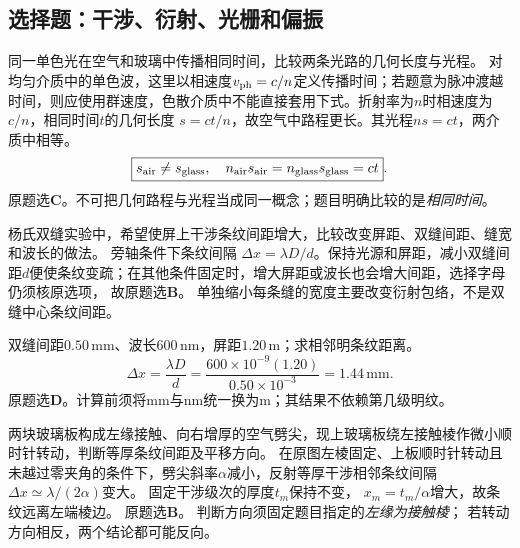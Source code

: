 
\subsection{选择题：干涉、衍射、光栅和偏振}

\problemtext 同一单色光在空气和玻璃中传播相同时间，比较两条光路的几何长度与光程。
\workings
对均匀介质中的单色波，这里以相速度$v_{\rm ph}=c/n$定义传播时间；若题意为脉冲渡越时间，则应使用群速度，色散介质中不能直接套用下式。折射率为$n$时相速度为$c/n$，相同时间$t$的几何长度
$s=ct/n$，故空气中路程更长。其光程$ns=ct$，两介质中相等。
\[
\boxed{s_{\rm air}\ne s_{\rm glass},\quad
n_{\rm air}s_{\rm air}=n_{\rm glass}s_{\rm glass}=ct}.
\]
原题选\textbf{C}。\crosscheck 不可把几何路程与光程当成同一概念；题目明确比较的是\emph{相同时间}。

\problemtext 杨氏双缝实验中，希望使屏上干涉条纹间距增大，比较改变屏距、双缝间距、缝宽和波长的做法。
\workings
旁轴条件下条纹间隔
$\Delta x=\lambda D/d$。保持光源和屏距，减小双缝间距$d$便使条纹变疏；在其他条件固定时，增大屏距或波长也会增大间距，选择字母仍须核原选项，
故原题选\textbf{B}。
\crosscheck 单独缩小每条缝的宽度主要改变衍射包络，不是双缝中心条纹间距。

\problemtext 双缝间距$0.50\,\mathrm{mm}$、波长$600\,\mathrm{nm}$，屏距$1.20\,\mathrm m$；求相邻明条纹距离。
\workings
\[
\boxed{\Delta x=\frac{\lambda D}{d}
=\frac{600\times10^{-9}(1.20)}{0.50\times10^{-3}}
=1.44\,\mathrm{mm}}.
\]
原题选\textbf{D}。\crosscheck 计算前须将mm与nm统一换为m；其结果不依赖第几级明纹。

\problemtext 两块玻璃板构成左缘接触、向右增厚的空气劈尖，现上玻璃板绕左接触棱作微小顺时针转动，判断等厚条纹间距及平移方向。
\workings
在原图左棱固定、上板顺时针转动且未越过零夹角的条件下，劈尖斜率$\alpha$减小，反射等厚干涉相邻条纹间隔
$\Delta x\simeq\lambda/(2\alpha)$变大。
固定干涉级次的厚度$t_m$保持不变，
$x_m=t_m/\alpha$增大，故条纹远离左端棱边。
原题选\textbf{B}。
\crosscheck 判断方向须固定题目指定的\emph{左缘为接触棱}；
若转动方向相反，两个结论都可能反向。

